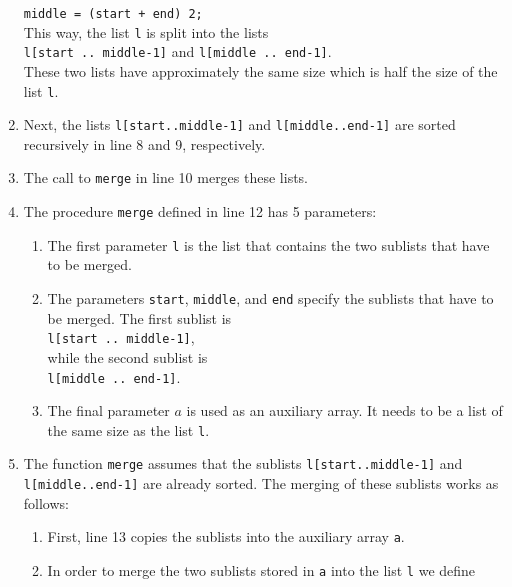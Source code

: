 \begin{enumerate}
      \texttt{middle = (start + end)  2;} 
      \\[0.2cm]
      This way, the list \texttt{l} is split into the lists 
      \\[0.2cm]
      \hspace*{1.3cm}
      \texttt{l[start .. middle-1]} \quad and \quad \texttt{l[middle .. end-1]}.
      \\[0.2cm]
      These two lists have approximately the same size which is half the size of the list \texttt{l}.
\item Next, the lists \texttt{l[start..middle-1]} and \texttt{l[middle..end-1]} are sorted
      recursively in line 8 and 9, respectively.
\item The call to \texttt{merge} in line 10 merges these lists.
\item The procedure \texttt{merge} defined in line 12 has 5 parameters: 
      \begin{enumerate}
      \item The first parameter \texttt{l} is the list that contains the two sublists that have to be merged.
      \item The parameters \texttt{start}, \texttt{middle}, and \texttt{end} specify the sublists
            that have to be merged.  The first sublist is 
            \\[0.2cm]
            \hspace*{1.3cm} 
            \texttt{l[start .. middle-1]}, 
            \\[0.2cm]
            while the second sublist is \\[0.2cm]
            \hspace*{1.3cm} 
            \texttt{l[middle .. end-1]}. 
      \item The final parameter $a$ is used as an auxiliary array.  It needs to be a list of the
            same size as the list \texttt{l}.
      \end{enumerate}
\item The function \texttt{merge} assumes that the sublists \texttt{l[start..middle-1]} and \linebreak
      \texttt{l[middle..end-1]} are already sorted.  The merging of these sublists works as follows:
      \begin{enumerate}
      \item First, line 13 copies the sublists into the auxiliary array \texttt{a}.
      \item In order to merge the two sublists stored in \texttt{a} into the list \texttt{l} we define

\end{enumerate}
\end{enumerate}
